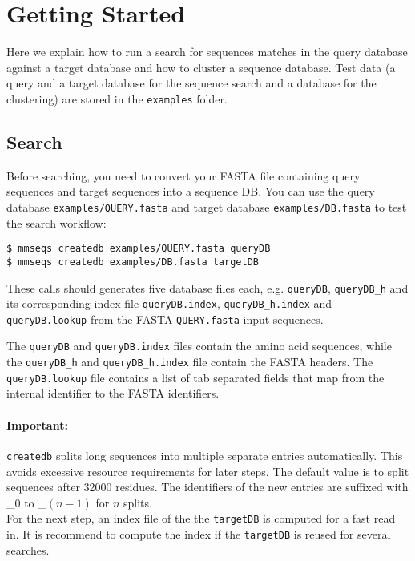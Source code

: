 \documentclass[11pt,a4paper]{scrreprt}
\begin{document}
\section{Getting Started}
Here we explain how to run a search for sequences matches in the query database against a target database and how to cluster a sequence database. Test data (a query and a target database for the sequence search and a database for the clustering) are stored in the \texttt{examples} folder.
\subsection*{Search}
Before searching, you need to convert your FASTA file containing query sequences and target sequences into a sequence DB. You can use the query database \texttt{examples/QUERY.fasta} and target database \texttt{examples/DB.fasta} to test the search workflow:

\begin{verbatim}
$ mmseqs createdb examples/QUERY.fasta queryDB
$ mmseqs createdb examples/DB.fasta targetDB
\end{verbatim}
 
These calls should generates five database files each, e.g. \texttt{queryDB}, \texttt{queryDB\_h} and its corresponding index file \texttt{queryDB.index}, \texttt{queryDB\_h.index} and \texttt{queryDB.lookup} from the FASTA \texttt{QUERY.fasta} input sequences.

The \texttt{queryDB} and \texttt{queryDB.index} files contain the amino acid sequences, while the \texttt{queryDB\_h} and \texttt{queryDB\_h.index} file contain the FASTA headers. The \texttt{queryDB.lookup} file contains a list of tab separated fields that map from the internal identifier to the FASTA identifiers.

\paragraph{Important:} \texttt{createdb} splits long sequences into multiple separate entries automatically. This avoids excessive resource requirements for later steps. The default value is to split sequences after 32000 residues. The identifiers of the new entries are suffixed with \_$0$ to \_$(n-1)$ for $n$ splits. \\

For the next step, an index file of the the \texttt{targetDB} is computed for a fast read in. It is recommend to compute the index if the \texttt{targetDB} is reused for several searches.
\end{document}
